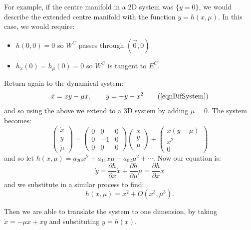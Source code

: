 \documentclass[../Main.tex]{subfiles}
\begin{document}
For example, if the centre manifold in a 2D system was $\{y = 0\}$, we would describe the extended centre manifold with the function $y = h(x, \mu)$. In this case, we would require:
\begin{itemize}
    \item $h(0, 0) = 0$ so $W^C$ passes through $(\vec 0, 0)$
    \item $h_x(0) = h_\mu(0) = 0$ so $W^C$ is tangent to $E^C$.
\end{itemize}
\begin{example}
    Return again to the dynamical system:
    \begin{equation*}
        \dot{x} = xy - \mu x,\qquad \dot{y} = -y + x^2
        \tag{\ref{eqnBifSystem}}
    \end{equation*}
    and so using the above we extend to a 3D system by adding $\dot \mu = 0$. The system becomes:
    \begin{equation*}
        \begin{pmatrix}\dot{x} \\ \dot y \\ \dot \mu\end{pmatrix} = 
        \begin{pmatrix}
            0 & 0 & 0 \\
            0 & -1 & 0 \\
            0 & 0 & 0
        \end{pmatrix}
        \begin{pmatrix}x \\ y \\ \mu\end{pmatrix} +
        \begin{pmatrix}x(y-\mu) \\ x^2 \\ 0\end{pmatrix}
    \end{equation*}
    and so let $h(x, \mu) = a_{20}x^2 + a_{11} x\mu + a_{02} \mu^2 + \cdots$. Now our equation is:
    \begin{equation*}
        \dot y = \frac{\partial h}{\partial x} \dot x + \frac{\partial h}{\partial \mu} \dot \mu = \frac{\partial h}{\partial x} \dot x
    \end{equation*}
    and we substitute in a similar process to find:
    \begin{equation*}
        h(x, \mu) = x^2 + O(x^3, \mu^3).
    \end{equation*}

    Then we are able to translate the system to one dimension, by taking $\dot{x} = -\mu x + xy$ and substituting $y = h(x)$.
\end{example}
\end{document}
